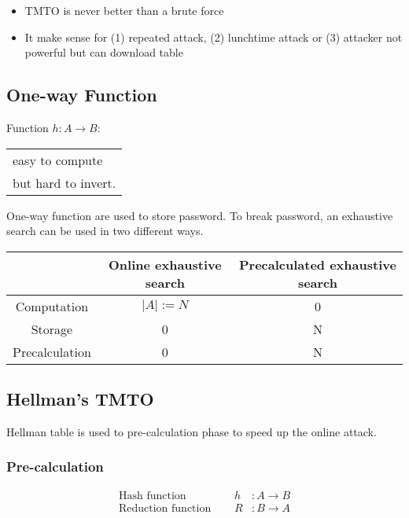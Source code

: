 
\begin{itemize}
    \item TMTO is never better than a brute force
    \item It make sense for (1) repeated attack, (2) lunchtime attack or
        (3) attacker not powerful but can download
        table
        \end{itemize}

\subsection{One-way Function} 

\begin{center}
    Function $h: A \rightarrow B$: 
    \begin{tabular}{l}
        easy to compute \\
        but hard to invert.
    \end{tabular}
\end{center}

One-way function are used to store password. To break password, an exhaustive
search can be used in two different ways.
\begin{table}[ht!]
    \centering
    \begin{tabular}{|c|c|c|}
        \hline
        & \textbf{Online exhaustive search} & \textbf{Precalculated
    exhaustive search} \\
        \hline
        Computation & $ |A|:=N $ & 0 \\
        Storage & 0 & N \\
        Precalculation & 0 & N \\
        \hline
    \end{tabular}
\end{table}

\subsection{Hellman's TMTO}
Hellman table is used to pre-calculation phase to speed up the online attack.

\subsubsection{Pre-calculation}

\begin{eqnarray*}
    \textrm{Hash function } \quad & h &: A \to B \\
    \textrm{Reduction function } \quad & R &: B \to A 
\end{eqnarray*}

